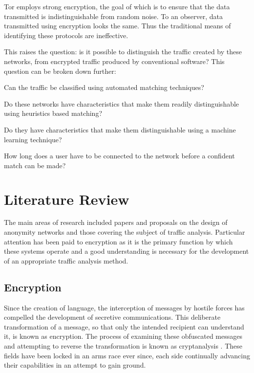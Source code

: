 \documentclass{ecuthesis}
\begin{document}
Tor employs strong encryption, the goal of which is to ensure that the data
transmitted is indistinguishable from random noise. To an observer, data
transmitted using encryption looks the same. Thus the traditional means of
identifying these protocols are ineffective.

This raises the question: is it possible to distinguish the traffic created by
these networks, from encrypted traffic produced by conventional software? This
question can be broken down further:

\begin{enumerate*}
  \item Can the traffic be classified using automated matching techniques?
  \item Do these networks have characteristics that make them readily
    distinguishable using heuristics based matching?
  \item Do they have characteristics that make them distinguishable using a
    machine learning technique?
  \item How long does a user have to be
    connected to the network before a confident match can be made?
\end{enumerate*}

\chapter{Literature Review}

The main areas of research included papers and proposals on the design of
anonymity networks and those covering the subject of traffic analysis.
Particular attention has been paid to encryption as it is the primary function
by which these systems operate and a good understanding is necessary for the
development of an appropriate traffic analysis method.

\section{Encryption}

Since the creation of language, the interception of messages by hostile forces
has compelled the development of secretive communications. This deliberate
transformation of a message, so that only the intended recipient can understand
it, is known as encryption. The process of examining these obfuscated messages
and attempting to reverse the transformation is known as cryptanalysis
\parencite{Schneier:1996uq}. These fields have been locked in an arms race
ever since, each side continually advancing their capabilities in an attempt to
gain ground.
\end{document}
